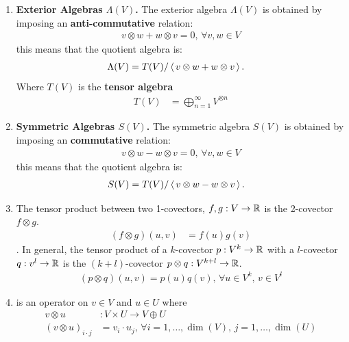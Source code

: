 \documentclass[10pt,a4paper]{report}
\begin{document}
\begin{enumerate}
	The set of all derivations on $A$ forms a vector space, $\DER(C^\infty(U))$.  Thus a $C^\infty(U)$ vector field gives rise to a derivation of the algebra $C^\infty(U)$.  Thus the mapping
	\begin{align*}
		\varphi : \XXX(U) &\to \DER(C^\infty(U)) \\
		X &\mapsto (f\mapsto Xf)
	\end{align*}this map is an isomorphism of vector spaces.
	\item \textbf{Exterior Algebras $\Lambda(V)$.} The exterior algebra $\Lambda(V)$ is obtained by imposing an \textbf{anti-commutative} relation: 
	\begin{align*}
		v\otimes w + w\otimes v = 0,\, \forall v,w \in V
	\end{align*}this means that the quotient algebra is:
	\begin{align*}
		\Lambda(V) &= T(V)/\left \langle\, v\otimes w + w\otimes v \,\right \rangle.
	\end{align*}Where $T(V)$ is the \textbf{tensor algebra}
	\begin{align*}
		T(V) &= \bigoplus_{n=1}^\infty V^{\otimes n}
	\end{align*}
	\item \textbf{Symmetric Algebras $S(V)$.} The symmetric algebra $S(V)$ is obtained by imposing an \textbf{commutative} relation: 
	\begin{align*}
		v\otimes w - w\otimes v = 0,\, \forall v,w \in V
	\end{align*}this means that the quotient algebra is:
	\begin{align*}
		S(V) &= T(V)/\left \langle\, v\otimes w - w\otimes v \,\right \rangle.
	\end{align*}
	\item {} The tensor product between two 1-covectors, $f,g: V \to \mathbb{R}$ is the 2-covector $f\otimes g$.
	\begin{align*}
		(f \otimes g)(u,v) &= f(u)g(v)
	\end{align*}.  In general, the tensor product of a $k$-covector $p:V^k \to \mathbb{R}$ with a $l$-covector $q:v^l \to \mathbb{R}$ is the $(k+l)$-covector $p\otimes q: V^{k+l}\to \mathbb{R}$.
	\begin{align*}
		(p\otimes q)(u,v) = p(u)q(v),\,\forall u\in V^k,\, v\in V^l
	\end{align*}
	\item {} is an operator on $v \in V$ and $u \in U$ where 
	\begin{align*}
		v \otimes u &: V \times U \to V \oplus U \\
		(v \otimes u)_{i\cdot j} &= v_i \cdot u_j,\, \forall i=1,\dots,\dim(V),\, j=1,\dots,\dim(U)
	\end{align*}
	

\end{enumerate}
\end{document}
